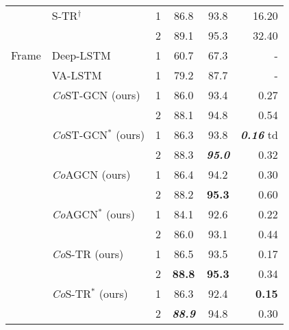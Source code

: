 \documentclass[journal]{IEEEtran}
\newcommand\paretocolor{lgreen!20}
\theoremstyle{definition}
\begin{document}
\begin{table}[!btp]
\begin{center}
{\begin{tabular}{llcccr}
    & S-TR$^\dagger$                                & 1             & 86.8  & 93.8    & 16.20 \\ 
    &                                               & 2             & 89.1  & 95.3    & 32.40 \\
    
    \midrule
    
    Frame
    & Deep-LSTM~\cite{Shahroudy_2016_NTURGBD}       & 1             & 60.7  & 67.3    & - \\ 
    & VA-LSTM~\cite{zhang2017view}                  & 1             & 79.2  & 87.7    & - \\ 
    \addlinespace[0.5ex] \cline{2-6} \addlinespace[0.5ex]
    & \textit{Co}ST-GCN (ours)                      & 1             & 86.0  & 93.4    & 0.27 \\
    &                                               & 2             & 88.1  & 94.8    & 0.54 \\
    & \textit{Co}ST-GCN$^*$ (ours)                  & 1             & 86.3  & \colorbox{\paretocolor}{93.8}    & \colorbox{\paretocolor}{\textbf{\textit{0.16}}} td\\
    &                                               & 2             & 88.3  & \colorbox{\paretocolor}{\textbf{\textit{95.0}}}    &  \colorbox{\paretocolor}{0.32} \\
    & \textit{Co}AGCN (ours)                        & 1             & 86.4  & 94.2    & 0.30 \\
    &                                               & 2             & 88.2  & \textbf{95.3}    & 0.60 \\
    & \textit{Co}AGCN$^*$ (ours)                    & 1             & 84.1  & 92.6    & 0.22 \\
    &                                               & 2             & 86.0  & 93.1    & 0.44 \\
    & \textit{Co}S-TR (ours)                        & 1             & \colorbox{\paretocolor}{86.5}  & 93.5    & \colorbox{\paretocolor}{0.17} \\
    &                                               & 2             & \colorbox{\paretocolor}{\textbf{88.8}}  & \colorbox{\paretocolor}{\textbf{95.3}}    & \colorbox{\paretocolor}{0.34} \\
    & \textit{Co}S-TR$^*$ (ours)                    & 1             & \colorbox{\paretocolor}{86.3}  & \colorbox{\paretocolor}{92.4}    &  \colorbox{\paretocolor}{\textbf{0.15}} \\
    &                                               & 2             & \colorbox{\paretocolor}{\textbf{\textit{88.9}}}  & \colorbox{\paretocolor}{94.8}    & \colorbox{\paretocolor}{0.30} \\
    \bottomrule
\end{tabular}
}
\end{center}
\end{table}
\end{document}
